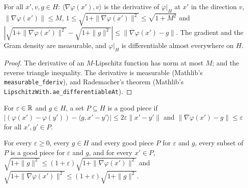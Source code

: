 \begin{lemma}
\label{lem:graph-gradient}
\leanok
{}
For all $x', v, g \in H$: $\langle \nabla\varphi(x'), v \rangle$ is the derivative of
$\varphi|_H$ at $x'$ in the direction $v$, $\|\nabla\varphi(x')\| \leq M$,
$1 \leq \sqrt{1 + \|\nabla\varphi(x')\|^2} \leq \sqrt{1 + M^2}$ and
$|\sqrt{1 + \|\nabla\varphi(x')\|^2} - \sqrt{1 + \|g\|^2}| \leq \|\nabla\varphi(x') - g\|$. The
gradient and the Gram density are measurable, and $\varphi|_H$ is differentiable almost
everywhere on $H$.
\end{lemma}

\begin{proof}
\leanok
The derivative of an $M$-Lipschitz function has norm at most $M$;  and
the reverse triangle inequality. The derivative is measurable (Mathlib's
\texttt{measurable\_\allowbreak fderiv}), and Rademacher's theorem (Mathlib's
\texttt{LipschitzWith.\allowbreak ae\_\allowbreak differentiableAt}).
\end{proof}

\begin{definition}
\label{def:good-piece}
\leanok
{}
For $\varepsilon \in \mathbb{R}$ and $g \in H$, a set $P \subseteq H$ is a good piece if
$|(\varphi(x') - \varphi(y')) - \langle g, x' - y' \rangle| \leq 2 \varepsilon \|x' - y'\|$ and
$\|\nabla\varphi(x') - g\| \leq \varepsilon$ for all $x', y' \in P$.
\end{definition}

\begin{lemma}
\label{lem:good-piece-gram}
\leanok
{}
For every $\varepsilon \geq 0$, every $g \in H$ and every good piece $P$ for $\varepsilon$ and $g$,
every subset of $P$ is a good piece for $\varepsilon$ and $g$, and for every $x' \in P$,
$\sqrt{1 + \|g\|^2} \leq (1 + \varepsilon) \sqrt{1 + \|\nabla\varphi(x')\|^2}$ and
$\sqrt{1 + \|\nabla\varphi(x')\|^2} \leq (1 + \varepsilon) \sqrt{1 + \|g\|^2}$.
\end{lemma}

